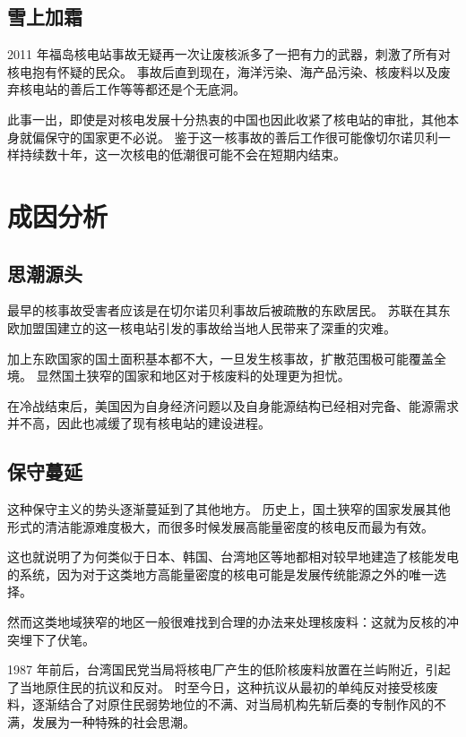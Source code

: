 \section{雪上加霜}

2011 年福岛核电站事故无疑再一次让废核派多了一把有力的武器，刺激了所有对核电抱有怀疑的民众。
事故后直到现在，海洋污染、海产品污染、核废料以及废弃核电站的善后工作等等都还是个无底洞。

此事一出，即使是对核电发展十分热衷的中国也因此收紧了核电站的审批，其他本身就偏保守的国家更不必说。
鉴于这一核事故的善后工作很可能像切尔诺贝利一样持续数十年，这一次核电的低潮很可能不会在短期内结束。

\chapter{成因分析}

\section{思潮源头}

最早的核事故受害者应该是在切尔诺贝利事故后被疏散的东欧居民。
苏联在其东欧加盟国建立的这一核电站引发的事故给当地人民带来了深重的灾难。

加上东欧国家的国土面积基本都不大，一旦发生核事故，扩散范围极可能覆盖全境。
显然国土狭窄的国家和地区对于核废料的处理更为担忧。

在冷战结束后，美国因为自身经济问题以及自身能源结构已经相对完备、能源需求并不高，因此也减缓了现有核电站的建设进程。

\section{保守蔓延}

这种保守主义的势头逐渐蔓延到了其他地方。
历史上，国土狭窄的国家发展其他形式的清洁能源难度极大，而很多时候发展高能量密度的核电反而最为有效。

这也就说明了为何类似于日本、韩国、台湾地区等地都相对较早地建造了核能发电的系统，因为对于这类地方高能量密度的核电可能是发展传统能源之外的唯一选择。

然而这类地域狭窄的地区一般很难找到合理的办法来处理核废料：这就为反核的冲突埋下了伏笔。

1987 年前后，台湾国民党当局将核电厂产生的低阶核废料放置在兰屿附近，引起了当地原住民的抗议和反对\cite{hsl}。
时至今日，这种抗议从最初的单纯反对接受核废料，逐渐结合了对原住民弱势地位的不满、对当局机构先斩后奏的专制作风的不满，发展为一种特殊的社会思潮。

